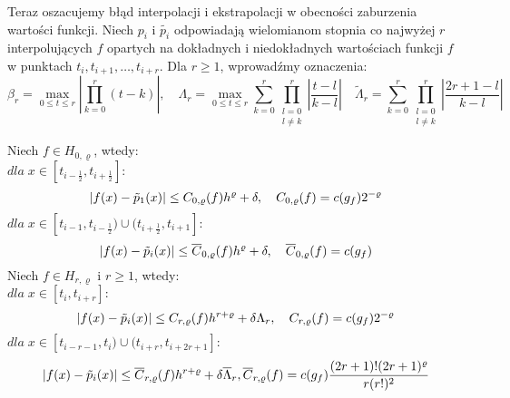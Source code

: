 \documentclass[oik, pdftex, robocza, man]{mgrwms}
\begin{document}
Teraz oszacujemy błąd interpolacji i ekstrapolacji w obecności zaburzenia wartości funkcji. Niech $p_{i}$ i $\tilde{p_{i}}$ odpowiadają wielomianom stopnia co najwyżej $r$ interpolujących $f$ opartych na dokładnych i niedokładnych wartościach funkcji $f$ w punktach $t_{i}, t_{i+1}, \dots, t_{i+r}$. Dla $r \geq 1$, wprowadźmy oznaczenia:
\begin{equation*}
    \beta_{r} = \max_{0 \leq t \leq r} |\prod_{k=0}^{r} (t-k)|, \quad
    \Lambda_{r} = \max_{0 \leq t \leq r} \sum_{k=0}^{r} \prod_{\substack{l=0 \\ l \neq k}}^{r} \left| \frac{t-l}{k-l} \right| \quad
    \tilde{\Lambda}_{r} = \sum_{k=0}^{r} \prod_{\substack{l=0 \\ l \neq k}}^{r} \left| \frac{2r+1-l}{k-l} \right|
\end{equation*}

\begin{lemma}
    Niech $f \in H_{0, \varrho}$, wtedy: \\
    $dla \; x \in [t_{i-\frac{1}{2}}, t_{i + \frac{1}{2}}] :$
    \begin{equation*}
        |f(x) - \tilde{p}_{1}(x)| \leq C_{0, \varrho}(f) h^{\varrho} + \delta, \quad C_{0, \varrho}(f) = c(g_{f}) 2^{-\varrho} \\
    \end{equation*}
    $dla \; x \in [t_{i-1}, t_{i - \frac{1}{2}}) \cup (t_{i + \frac{1}{2}}, t_{i+1}]  :$
    \begin{equation*}
        |f(x) - \tilde{p}_{i}(x)| \leq \overline{C} _{0, \varrho}(f) h^{\varrho}  + \delta, \quad \overline{C} _{0, \varrho}(f) = c(g_{f}) \\
    \end{equation*}
    Niech $f \in H_{r, \varrho}$ i $r \geq 1$, wtedy: \\
    $dla \; x \in [t_{i}, t_{i + r}] : $
    \begin{equation*}
        |f(x) - \tilde{p}_{i}(x)| \leq C_{r, \varrho}(f) h^{r+\varrho} + \delta\Lambda_{r}, \quad C_{r, \varrho}(f) = c(g_{f}) 2^{-\varrho} \\
    \end{equation*}
    $dla \; x \in [t_{i-r-1}, t_{i}) \cup (t_{i + r}, t_{i+2r+1}]  :$
    \begin{equation*}
        |f(x) - \tilde{p}_{i}(x)| \leq \overline{C} _{r, \varrho}(f) h^{r+\varrho} + \delta\overline{\Lambda}_{r}, \overline{C} _{r, \varrho}(f) = c(g_{f}) \frac{(2r+1)!(2r+1)^{\varrho}}{r(r!)^{2}} \\
    \end{equation*}
\end{lemma}
\end{document}

